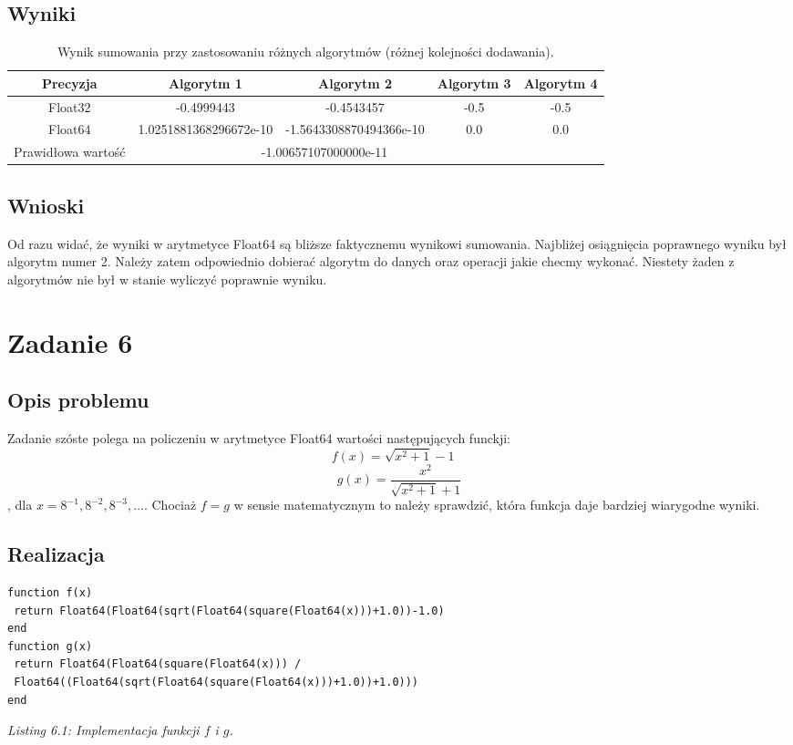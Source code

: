 \documentclass[]{article}
\begin{document}
\subsection{Wyniki}
\begin{table}[h]
	\centering
	\begin{tabular}{||c c c c c||} 
		\hline
		Precyzja & Algorytm 1 & Algorytm 2 & Algorytm 3 & Algorytm 4 \\ [0.5ex] 
		\hline\hline
		Float32 & -0.4999443 &  -0.4543457 & -0.5 & -0.5\\ 
		Float64 & 1.0251881368296672e-10 & -1.5643308870494366e-10 & 0.0 & 0.0\\
		\hline
		Prawidłowa wartość & \multicolumn{3}{c}{-1.00657107000000e-11}&\\
		\hline
	\end{tabular}
	\caption{Wynik sumowania przy zastosowaniu różnych algorytmów (różnej kolejności dodawania).}
\end{table}
\subsection{Wnioski}
Od razu widać, że wyniki w arytmetyce Float64 są bliższe faktycznemu wynikowi sumowania. Najbliżej osiągnięcia poprawnego wyniku był algorytm numer 2. Należy zatem odpowiednio dobierać algorytm do danych oraz operacji jakie checmy wykonać. Niestety żaden z algorytmów nie był w stanie wyliczyć poprawnie wyniku.  

\section{Zadanie 6}
\subsection{Opis problemu}
Zadanie szóste polega na policzeniu w arytmetyce Float64 wartości następujących funckji: \[ f(x) = \sqrt{x^2 + 1} - 1\quad\]\[g(x) = \frac{x^2}{\sqrt{x^2 + 1} + 1}\], dla \( x = 8^{-1}, 8^{-2}, 8^{-3}, ... \). Chociaż \(f = g\) w sensie matematycznym to należy sprawdzić, która funkcja daje bardziej wiarygodne wyniki.
\subsection{Realizacja}
\begin{lstlisting}
function f(x)
 return Float64(Float64(sqrt(Float64(square(Float64(x)))+1.0))-1.0)
end
function g(x)
 return Float64(Float64(square(Float64(x))) /
 Float64((Float64(sqrt(Float64(square(Float64(x)))+1.0))+1.0)))
end
\end{lstlisting}
\textit{Listing 6.1: Implementacja funkcji $f$ i $g$.}
\newpage
\end{document}
